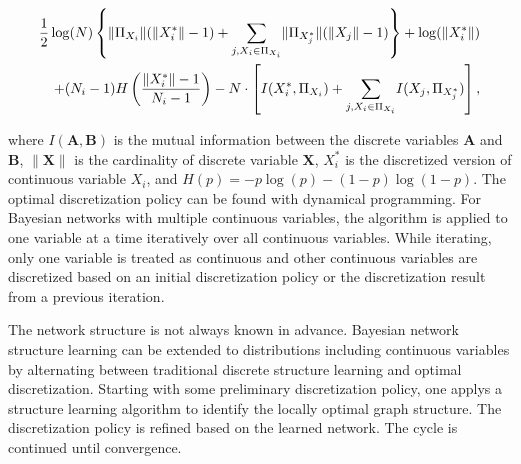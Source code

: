 \begin{small}
\begin{equation}
\begin{aligned}
\frac{1}{2} \log(N) \left\lbrace  \lVert \Pi_{X_i} \rVert (\lVert X^*_i \rVert - 1) +
 {\sum_{j,X_i \in \Pi_{X_i}}} \lVert \Pi_{X^*_j} \rVert (\lVert X_j \rVert - 1) \right\rbrace + \log(\lVert {X^*_i} \rVert) \\
 + (N_i-1) H \left( {{\|X^*_i\| - 1}\over{N_i -1}}  \right) -N \cdot \left[ I(X^*_i,\Pi_{X_i}) + {\sum_{j,X_i \in \Pi_{X_i}}} I(X_j, \Pi_{X^*_j}) \right],
\end{aligned}
\end{equation}
\end{small}

\noindent
where $I(\boldsymbol{A},\boldsymbol{B})$ is the mutual information between the discrete variables $\boldsymbol{A}$ and $\boldsymbol{B}$, $\|\boldsymbol{X}\|$ is the cardinality of discrete variable $\boldsymbol{X}$, $X^*_i$ is the discretized version of continuous variable $X_i$, and $H(p) = -p \log(p) - (1-p) \log(1-p)$.
The optimal discretization policy can be found with dynamical programming.
For Bayesian networks with multiple continuous variables, the algorithm is applied to one variable at a time iteratively over all continuous variables.
While iterating, only one variable is treated as continuous and other continuous variables are discretized based on an initial discretization policy or the discretization result from a previous iteration.

The network structure is not always known in advance. Bayesian network structure learning can be extended to distributions including continuous variables by alternating between traditional discrete structure learning and optimal discretization. Starting with some preliminary discretization policy, one applys a structure learning algorithm to identify the locally optimal graph structure. The discretization policy is refined based on the learned network. The cycle is continued until convergence.

